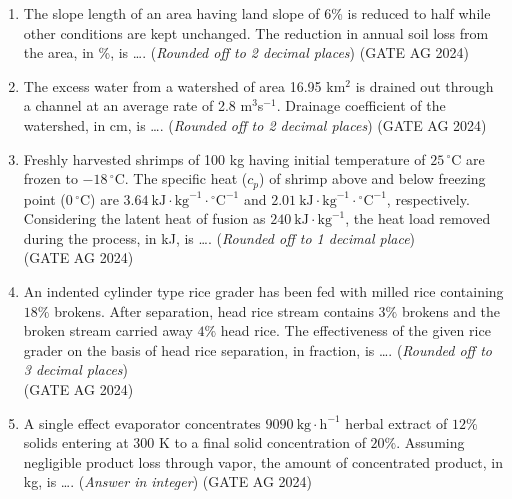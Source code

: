 \documentclass[journal]{IEEEtran}
\begin{document}
\begin{enumerate}
\medskip

\item
The slope length of an area having land slope of 6\% is reduced to half while other conditions are kept unchanged. The reduction in annual soil loss from the area, in \%, is \dots. (\textit{Rounded off to 2 decimal places})
 \hfill(GATE AG 2024)\\

\medskip

\item
The excess water from a watershed of area 16.95 km$^2$ is drained out through a channel at an average rate of 2.8 m$^3$s$^{-1}$. Drainage coefficient of the watershed, in cm, is \dots. (\textit{Rounded off to 2 decimal places})
 \hfill(GATE AG 2024)\\

\medskip

\item 
Freshly harvested shrimps of 100 kg having initial temperature of $25\,^\circ$C are frozen to $-18\,^\circ$C. The specific heat ($c_p$) of shrimp above and below freezing point ($0\,^\circ$C) are $3.64~\text{kJ}\cdot\text{kg}^{-1}\cdot{}^\circ\text{C}^{-1}$ and $2.01~\text{kJ}\cdot\text{kg}^{-1}\cdot{}^\circ\text{C}^{-1}$, respectively. Considering the latent heat of fusion as $240~\text{kJ}\cdot\text{kg}^{-1}$, the heat load removed during the process, in kJ, is \dots. (\emph{Rounded off to 1 decimal place}) \\[2ex]
 \hfill(GATE AG 2024)\\

     \medskip
    
\item 
An indented cylinder type rice grader has been fed with milled rice containing $18\%$ brokens. After separation, head rice stream contains $3\%$ brokens and the broken stream carried away $4\%$ head rice. The effectiveness of the given rice grader on the basis of head rice separation, in fraction, is \dots. (\emph{Rounded off to 3 decimal places}) \\[2ex]
 \hfill(GATE AG 2024)\\

     \medskip
    
\item 
A single effect evaporator concentrates $9090~\text{kg}\cdot\text{h}^{-1}$ herbal extract of $12\%$ solids entering at 300 K to a final solid concentration of $20\%$. Assuming negligible product loss through vapor, the amount of concentrated product, in kg, is \dots. (\emph{Answer in integer})
 \hfill(GATE AG 2024)\\


\end{enumerate}
\end{document}
